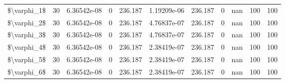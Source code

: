 \begin{tabular}{lrrrrrrrrrr}
 \$\textbackslash{}varphi\_1\$ &  30 & 6.36542e-08 & 0        &    236.187  &    1.19209e-06 &     236.187  &     0        &         nan & 100           & 100           \\
 \$\textbackslash{}varphi\_2\$ &  30 & 6.36542e-08 & 0        &    236.187  &    4.76837e-07 &     236.187  &     0        &         nan & 100           & 100           \\
 \$\textbackslash{}varphi\_3\$ &  30 & 6.36542e-08 & 0        &    236.187  &    4.76837e-07 &     236.187  &     0        &         nan & 100           & 100           \\
 \$\textbackslash{}varphi\_4\$ &  30 & 6.36542e-08 & 0        &    236.187  &    2.38419e-07 &     236.187  &     0        &         nan & 100           & 100           \\
 \$\textbackslash{}varphi\_5\$ &  30 & 6.36542e-08 & 0        &    236.187  &    2.38419e-07 &     236.187  &     0        &         nan & 100           & 100           \\
 \$\textbackslash{}varphi\_6\$ &  30 & 6.36542e-08 & 0        &    236.187  &    2.38419e-07 &     236.187  &     0        &         nan & 100           & 100           \\
\hline
\end{tabular}
